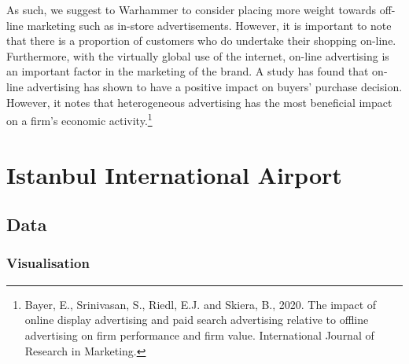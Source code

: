 \documentclass[11pt]{article}
\begin{document}
As such, we suggest to Warhammer to consider placing more weight towards off-line marketing such as in-store advertisements. However, it is important to note that there is a proportion of customers who do undertake their shopping on-line. Furthermore, with the virtually global use of the internet, on-line advertising is an important factor in the marketing of the brand. A study has found that on-line advertising has shown to have a positive impact on buyers' purchase decision. However, it notes that heterogeneous advertising has the most beneficial impact on a firm's economic activity.\footnote{Bayer, E., Srinivasan, S., Riedl, E.J. and Skiera, B., 2020. The impact of online display advertising and paid search advertising relative to offline advertising on firm performance and firm value. International Journal of Research in Marketing.}

\newpage\section{Istanbul International Airport}
\subsection{Data}
\subsubsection{Visualisation}
\begin{figure}[h!]
\centering 
{}
\end{figure}
\end{document}
